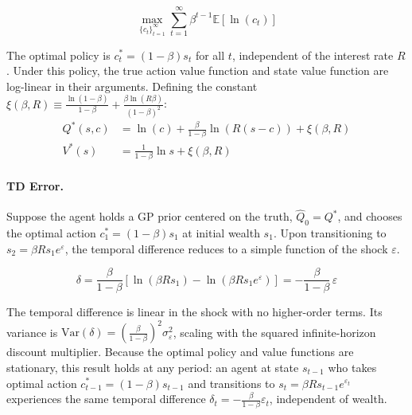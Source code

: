 \begin{equation}
  \max_{\{c_t\}_{t=1}^\infty}
    \sum_{t=1}^\infty \beta^{t-1}
    \mathbb{E}\left[\ln(c_t)\right]
\end{equation}

The optimal policy is $c_t^* = (1-\beta)s_t$
for all $t$, independent of the interest rate $R$.
Under this policy, the true action value function
and state value function are log-linear in their
arguments. Defining the constant
$\xi(\beta,R) \equiv \frac{\ln(1-\beta)}{1-\beta}
+ \frac{\beta\ln(R\beta)}{(1-\beta)^2}$:
\begin{align}
  Q^*(s,c) &= \ln(c)
    + \frac{\beta}{1-\beta}\ln(R(s-c))
    + \xi(\beta, R) \\
  V^*(s) &= \frac{1}{1-\beta}\ln s
    + \xi(\beta, R)
\end{align}

\paragraph{TD Error.}
Suppose the agent holds a GP prior centered on the
truth, $\hat{Q}_0 = Q^*$, and chooses the optimal
action $c_1^* = (1-\beta)s_1$ at initial wealth
$s_1$. Upon transitioning to
$s_2 = \beta R s_1 e^{\varepsilon}$, the temporal difference reduces to a simple function of the shock $\varepsilon$.

\begin{equation}
  \delta
    = \frac{\beta}{1-\beta}
      \left[
        \ln(\beta R s_1)
        - \ln(\beta R s_1 e^{\varepsilon})
      \right]
    = -\frac{\beta}{1-\beta}\,\varepsilon
\end{equation}

The temporal difference is linear in the shock with no
higher-order terms. Its variance is $\mathrm{Var}(\delta) = \left(\tfrac{\beta}{1-\beta}\right)^2
\sigma_\varepsilon^2$, scaling with the squared infinite-horizon discount multiplier. Because
the optimal policy and value functions are stationary, this result holds at any period: an
agent at state $s_{t-1}$ who takes optimal action $c_{t-1}^* = (1-\beta)s_{t-1}$ and transitions to
$s_t = \beta R s_{t-1} e^{\varepsilon_t}$ experiences the same temporal difference
$\delta_t = -\frac{\beta}{1-\beta}\varepsilon_t$,
independent of wealth.

